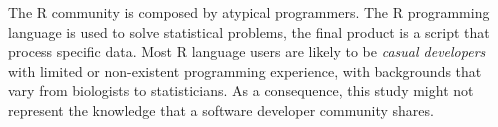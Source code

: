     The R community is composed by atypical programmers.
    The R programming language is used to solve statistical problems, the final product is a script that process specific data.
    Most R language users are likely to be \textit{casual developers} with limited or non-existent programming experience, with backgrounds that vary from biologists to statisticians.
    As a consequence, this study might not represent the knowledge that a software developer community shares.


